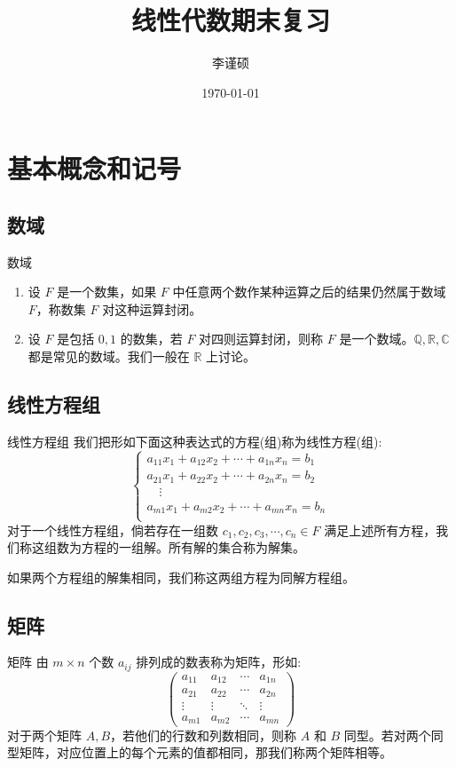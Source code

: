 \documentclass[a4paper,12pt]{ctexart}
\title{\textbf{线性代数期末复习}}
\author{李谨硕}
\date{\today}
\begin{document}
\maketitle
\tableofcontents
\newpage

\section{基本概念和记号}

\subsection{数域}
\begin{mydef}{数域}{}
\begin{enumerate}
    \item 设 $F$ 是一个数集，如果 $F$ 中任意两个数作某种运算之后的结果仍然属于数域 $F$，称数集 $F$ 对这种运算封闭。
    \item 设 $F$ 是包括 $0, 1$ 的数集，若 $F$ 对四则运算封闭，则称 $F$ 是一个数域。$\mathbb{Q, R, C}$ 都是常见的数域。我们一般在 $\mathbb{R}$ 上讨论。
\end{enumerate}
\end{mydef}

\subsection{线性方程组}
\begin{mydef}{线性方程组}{}
我们把形如下面这种表达式的方程(组)称为线性方程(组):
\[
\begin{cases}
a_{11}x_1 + a_{12}x_2 + \cdots + a_{1n}x_n = b_1\\
a_{21}x_1 + a_{22}x_2 + \cdots + a_{2n}x_n = b_2\\
\quad \vdots \\
a_{m1}x_1 + a_{m2}x_2 + \cdots + a_{mn}x_n = b_n\\
\end{cases}
\]
对于一个线性方程组，倘若存在一组数 $c_1, c_2, c_3, \cdots , c_n \in F$ 满足上述所有方程，我们称这组数为方程的一组解。所有解的集合称为解集。

如果两个方程组的解集相同，我们称这两组方程为同解方程组。
\end{mydef}

\subsection{矩阵}
\begin{mydef}{矩阵}{}
由 $m \times n$ 个数 $a_{ij}$ 排列成的数表称为矩阵，形如:
\[
\begin{pmatrix}
a_{11} & a_{12} & \cdots & a_{1n} \\
a_{21} & a_{22} & \cdots & a_{2n} \\
\vdots & \vdots & \ddots & \vdots \\
a_{m1} & a_{m2} & \cdots & a_{mn}
\end{pmatrix}
\]
对于两个矩阵 $A,B$，若他们的行数和列数相同，则称 $A$ 和 $B$ 同型。若对两个同型矩阵，对应位置上的每个元素的值都相同，那我们称两个矩阵相等。
\end{mydef}
\end{document}
